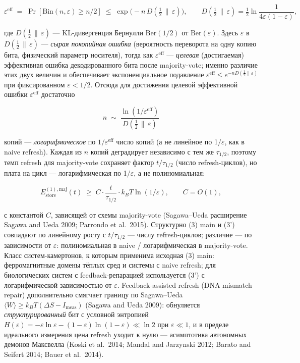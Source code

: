 \documentclass[pdflatex,sn-mathphys-ay]{sn-jnl}
\begin{document}
\[\varepsilon^{\text{eff}} \;=\; \Pr\!\left[\mathrm{Bin}(n,\varepsilon) \ge n/2\right] \;\le\; \exp\!\bigl(-n\, D(\tfrac{1}{2}\,\|\,\varepsilon)\bigr), \qquad D(\tfrac{1}{2}\,\|\,\varepsilon) = \tfrac{1}{2}\ln\frac{1}{4\varepsilon(1-\varepsilon)},\]



где \(D(\tfrac{1}{2}\,\|\,\varepsilon)\) --- KL-дивергенция Бернулли \(\mathrm{Ber}(1/2)\) от \(\mathrm{Ber}(\varepsilon)\). Здесь \(\varepsilon\) в \(D(\tfrac{1}{2}\,\|\,\varepsilon)\) --- \emph{сырая покопийная ошибка} (вероятность переворота на одну копию бита, физический параметр носителя), тогда как \(\varepsilon^{\text{eff}}\) --- \emph{целевая} (достигаемая) эффективная ошибка декодированного бита после majority-vote; именно различие этих двух величин и обеспечивает экспоненциальное подавление \(\varepsilon^{\text{eff}} \le e^{-n D(\frac{1}{2}\|\varepsilon)}\) при фиксированном \(\varepsilon < 1/2\). Отсюда для достижения целевой эффективной ошибки \(\varepsilon^{\text{eff}}\) достаточно



\[n \;\sim\; \frac{\ln(1/\varepsilon^{\text{eff}})}{D(\tfrac{1}{2}\,\|\,\varepsilon)}\]



копий --- \emph{логарифмическое} по \(1/\varepsilon^{\text{eff}}\) число копий (а не линейное по 1\(/\varepsilon\), как в naive refresh). Каждая из \(n\) копий деградирует независимо с тем же \(\tau_{1/2}\), поэтому темп refresh для majority-vote сохраняет фактор \(t/\tau_{1/2}\) (число refresh-циклов), но плата на цикл --- логарифмическая по 1\(/\varepsilon\), а не полиномиальная:



\begin{equation}E_{\text{store}}^{(1),\text{maj}}(t) \;\ge\; C \cdot \frac{t}{\tau_{1/2}} \cdot k_B T \ln(1/\varepsilon), \qquad C = O(1), \tag{3'}\end{equation}



с константой \(C\), зависящей от схемы majority-vote (Sagawa--Ueda расширение Sagawa and Ueda 2009; Parrondo et al.~2015). Структурно (3) main и (3') совпадают по линейному росту с \(t/\tau_{1/2}\) --- числу refresh-циклов; различие --- по зависимости от \(\varepsilon\): полиномиальная в naive / логарифмическая в majority-vote. Класс систем-камертонов, к которым применима исходная (3) main: ферромагнитные домены тёплых сред и системы с naive refresh; для биологических систем с feedback-репарацией используется (3') с логарифмической зависимостью от \(\varepsilon\). Feedback-assisted refresh (DNA mismatch repair) дополнительно смягчает границу по Sagawa--Ueda \(\langle W \rangle \ge k_B T (\Delta S - I_{\text{meas}})\) (Sagawa and Ueda 2009): обнуляется \emph{структурированный} бит с условной энтропией \(H(\varepsilon) = -\varepsilon\ln\varepsilon - (1-\varepsilon)\ln(1-\varepsilon) \ll \ln 2\) при \(\varepsilon \ll 1\), и в пределе идеального измерения цена refresh уходит к нулю --- асимптотика автономных демонов Максвелла (Koski et al.~2014; Mandal and Jarzynski 2012; Barato and Seifert 2014; Bauer et al.~2014).
\end{document}
